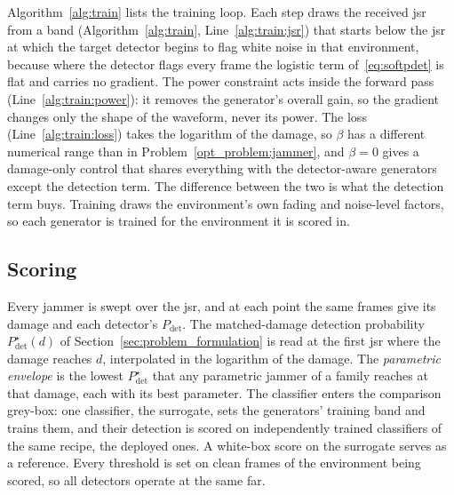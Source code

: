 Algorithm~\ref{alg:train} lists the training loop.
Each step draws the received \ac{jsr} from a band (Algorithm~\ref{alg:train}, Line~\ref{alg:train:jsr}) that starts below the \ac{jsr} at which the target detector begins to flag white noise in that environment, because where the detector flags every frame the logistic term of~\eqref{eq:softpdet} is flat and carries no gradient.
The power constraint acts inside the forward pass (Line~\ref{alg:train:power}): it removes the generator's overall gain, so the gradient changes only the shape of the waveform, never its power.
The loss (Line~\ref{alg:train:loss}) takes the logarithm of the damage, so $\beta$ has a different numerical range than in Problem~\ref{opt_problem:jammer}, and $\beta=0$ gives a damage-only control that shares everything with the detector-aware generators except the detection term.
The difference between the two is what the detection term buys.
Training draws the environment's own fading and noise-level factors, so each generator is trained for the environment it is scored in.

\subsection{Scoring} \label{sec:method:scoring}
Every jammer is swept over the \ac{jsr}, and at each point the same frames give its damage and each detector's $P_\text{det}$.
The matched-damage detection probability $P^{\star}_\text{det}(d)$ of Section~\ref{sec:problem_formulation} is read at the first \ac{jsr} where the damage reaches $d$, interpolated in the logarithm of the damage.
The \textit{parametric envelope} is the lowest $P^{\star}_\text{det}$ that any parametric jammer of a family reaches at that damage, each with its best parameter.
The classifier enters the comparison grey-box: one classifier, the surrogate, sets the generators' training band and trains them, and their detection is scored on independently trained classifiers of the same recipe, the deployed ones.
A white-box score on the surrogate serves as a reference.
Every threshold is set on clean frames of the environment being scored, so all detectors operate at the same \ac{far}.
